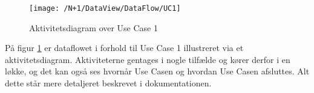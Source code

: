\begin{figure}[H]
	\centering
	\texttt{[image: /N+1/DataView/DataFlow/UC1]}
	\caption{Aktivitetsdiagram over Use Case 1}	
	\label{AktDia}
\end{figure}

På figur \ref{AktDia} er dataflowet i forhold til Use Case 1 illustreret via et aktivitetsdiagram. Aktiviteterne gentages i nogle tilfælde og kører derfor i en løkke, og det kan også ses hvornår Use Casen og hvordan Use Casen afsluttes. Alt dette står mere detaljeret beskrevet i dokumentationen. 